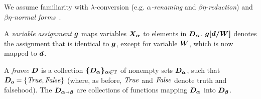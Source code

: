 We assume familiarity with $\lambda$-conversion (e.g. \emph{$\alpha$-renaming} and
\emph{$\beta\eta$-reduction}) and \emph{$\beta\eta$-normal forms}~\cite{barendregt13book}.






A \emph{variable assignment} $\boldsymbol{g}$ maps
variables $\boldsymbol{X_\alpha}$ to elements in $\boldsymbol{D_\alpha}$. $\boldsymbol{g[d/W]}$ denotes the
assignment that is identical to $\boldsymbol{g}$, except for variable $\boldsymbol{W}$, which is
now mapped to $\boldsymbol{d}$.

\begin{definition}\label{homlframe}
A \emph{frame} $\boldsymbol{D}$ is a collection $\boldsymbol{\{D_\alpha\}_{\alpha\in\text{\textrm{T}}}}$
of nonempty sets $\boldsymbol{D_\alpha}$, such that $\boldsymbol{D_o} = \{\mathit{True},\mathit{False}\}$
(where, as before, $\mathit{True}$ and $\mathit{False}$ denote truth and falsehood).  The
$\boldsymbol{D_{\alpha\shortrightarrow\beta}}$ are collections of functions mapping
$\boldsymbol{D_\alpha}$ into $\boldsymbol{D_\beta}$. 
\end{definition}





